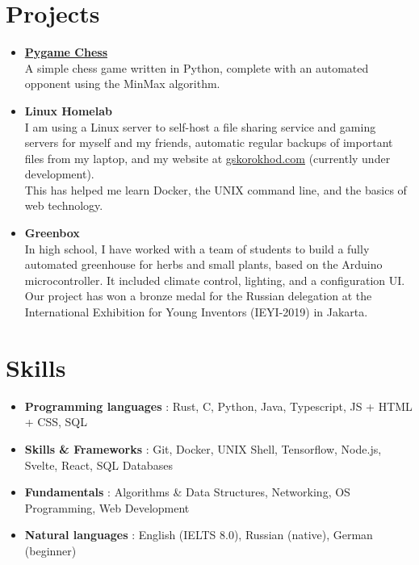 \documentclass[letterpaper,11pt]{article}
\newcommand{\resumeItem}[2]{
  \item\small{
    \textbf{#1}{ #2 \vspace{-2pt}}
  }
}
\newcommand{\resumeSubItem}[2]{\resumeItem{#1}{#2}\vspace{-4pt}}
\newcommand{\resumeSubHeadingListStart}{\begin{itemize}[leftmargin=*]}
\newcommand{\resumeSubHeadingListEnd}{\end{itemize}}
\begin{document}
\section{Projects}
  \resumeSubHeadingListStart
    \resumeSubItem{\href{https://github.com/gskorokhod/PygameChess}{Pygame Chess} \\}
      {A simple chess game written in Python, complete with an automated opponent using the MinMax algorithm.}
    \resumeSubItem{Linux Homelab \\}
      {I am using a Linux server to self-host a file sharing service and gaming servers for myself and my friends, automatic regular backups of important files from my laptop, and my website at \href{https://gskorokhod.com}{gskorokhod.com} (currently under development).\\ This has helped me learn Docker, the UNIX command line, and the basics of web technology. }
    \resumeSubItem{Greenbox \\}
      {In high school, I have worked with a team of students to build a fully automated greenhouse for herbs and small plants, based on the Arduino microcontroller. It included climate control, lighting, and a configuration UI. Our project has won a bronze medal for the Russian delegation at the International Exhibition for Young Inventors (IEYI-2019) in Jakarta.}
  \resumeSubHeadingListEnd

\section{Skills}
 \resumeSubHeadingListStart
   \resumeSubItem{Programming languages}{: Rust, C, Python, Java, Typescript, JS + HTML + CSS, SQL }
   \resumeSubItem{Skills \& Frameworks}{: Git, Docker, UNIX Shell, Tensorflow, Node.js, Svelte, React, SQL Databases }
   \resumeSubItem{Fundamentals}{: Algorithms \& Data Structures, Networking, OS Programming, Web Development }
   \resumeSubItem{Natural languages}{: English (IELTS 8.0), Russian (native), German (beginner) }
 \resumeSubHeadingListEnd
\end{document}
